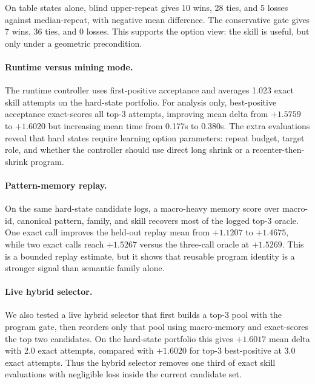 \documentclass[10pt,twocolumn,letterpaper]{article}
\begin{document}
On table states alone, blind upper-repeat gives 10 wins, 28 ties, and 5 losses
against median-repeat, with negative mean difference.  The conservative gate
gives 7 wins, 36 ties, and 0 losses.  This supports the option view: the skill
is useful, but only under a geometric precondition.

\paragraph{Runtime versus mining mode.}
The runtime controller uses first-positive acceptance and averages 1.023 exact
skill attempts on the hard-state portfolio.  For analysis only, best-positive
acceptance exact-scores all top-3 attempts, improving mean delta from
$+1.5759$ to $+1.6020$ but increasing mean time from 0.177s to 0.380s.  The
extra evaluations reveal that hard states require learning option parameters:
repeat budget, target role, and whether the controller should use direct long
shrink or a recenter-then-shrink program.

\paragraph{Pattern-memory replay.}
On the same hard-state candidate logs, a macro-heavy memory score over
macro-id, canonical pattern, family, and skill recovers most of the logged
top-3 oracle.  One exact call improves the held-out replay mean from $+1.1207$
to $+1.4675$, while two exact calls reach $+1.5267$ versus the three-call
oracle at $+1.5269$.  This is a bounded replay estimate, but it shows that
reusable program identity is a stronger signal than semantic family alone.

\paragraph{Live hybrid selector.}
We also tested a live hybrid selector that first builds a top-3 pool with the
program gate, then reorders only that pool using macro-memory and exact-scores
the top two candidates.  On the hard-state portfolio this gives $+1.6017$ mean
delta with 2.0 exact attempts, compared with $+1.6020$ for top-3
best-positive at 3.0 exact attempts.  Thus the hybrid selector removes one
third of exact skill evaluations with negligible loss inside the current
candidate set.
\end{document}
